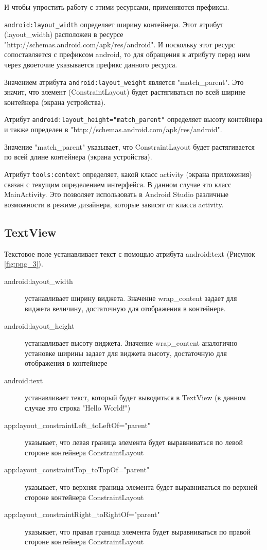 И чтобы упростить работу с этими ресурсами, применяются префиксы.\par
\texttt{android:layout\_width} определяет ширину контейнера. Этот атрибут
(layout\_width) расположен в ресурсе
"http://schemas.android.com/apk/res/android". И поскольку этот ресурс
сопоставляется с префиксом android, то для обращения к атрибуту перед ним
через двоеточие указывается префикс данного ресурса.\par
Значением атрибута \texttt{android:layout\_weight} является
"match\_parent". Это значит, что элемент (ConstraintLayout)
будет растягиваться по всей ширине контейнера (экрана устройства).\par
Атрибут \texttt{android:layout\_height="match\_parent"} определяет высоту
контейнера и также определен в
"http://schemas.android.com/apk/res/android".\par
Значение "match\_parent" указывает, что ConstraintLayout
будет растягивается по всей длине контейнера (экрана устройства).\par
Атрибут \texttt{tools:context} определяет, какой класс
activity (экрана приложения) связан с текущим определением интерфейса.
В данном случае это класс MainActivity. Это позволяет использовать
в Android Studio различные возможности в режиме дизайнера,
которые зависят от класса activity.

\subsection{TextView}
Текстовое поле устанавливает текст с помощью атрибута android:text
(Рисунок \ref{fig:png_3}).


\begin{description}
	\item[android:layout\_width] устанавливает ширину виджета. Значение
		wrap\_content задает для виджета величину, достаточную для
		отображения в контейнере.
	\item[android:layout\_height] устанавливает высоту виджета. Значение
		wrap\_content аналогично установке ширины задает для виджета высоту,
		достаточную для отображения в контейнере
	\item[android:text] устанавливает текст, который будет выводиться
		в TextView (в данном случае это строка "Hello World!")
	\item[app:layout\_constraintLeft\_toLeftOf="parent"] указывает, что левая
		граница элемента будет выравниваться по левой стороне контейнера
		ConstraintLayout
	\item[app:layout\_constraintTop\_toTopOf="parent"] указывает, что верхняя
		граница элемента будет выравниваться по верхней стороне контейнера
		ConstraintLayout
	\item[app:layout\_constraintRight\_toRightOf="parent"] указывает,
		что правая граница элемента будет выравниваться по правой стороне
		контейнера ConstraintLayout
\end{description}

